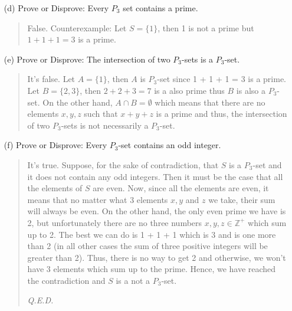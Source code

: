 \documentclass[12pt, a4paper]{article}                      %
\begin{document}
\begin{itemize}
\begin{itemize}
\item[]

\item[(d)]
Prove or Disprove: Every $P_3$ set contains a prime.
\begin{quote}
False. Counterexample: Let $S = \{1\}$, then 1 is not a prime but $1 + 1 + 1 = 3$ is a prime.
\end{quote}

\item[]
\item[]
\item[]

\item[(e)]
Prove or Disprove: The intersection of two $P_3$-sets is a $P_3$-set.
\begin{quote}
It's false. Let $A = \{1\}$, then $A$ is $P_3$-set since 1 + 1 + 1 = 3 is a prime.
Let $B = \{2, 3\}$, then $2 + 2 + 3 = 7$ is a also prime thus $B$ is also a $P_3$-set. On the other hand,
$A \cap B = \emptyset$ which means that there are no elements $x,y,z$ such that $x + y + z$ is a prime and thus,
the intersection of two $P_3$-sets is not necessarily a $P_3$-set.
\end{quote} 

\item[]

\item[(f)]
Prove or Disprove: Every $P_3$-set contains an odd integer.
\begin{quote}
It's true. Suppose, for the sake of contradiction, that $S$ is a $P_3$-set and it does not contain any odd integers. Then it must be the case that
all the elements of $S$ are even. Now, since all the elements are even, it means that no matter
what 3 elements $x, y$ and $z$ we take, their sum will always be even. On the other hand, the only even
prime we have is 2, but unfortunately there are no three numbers $x, y, z \in \mathbb{Z}^+$ which sum up to 2. The best we can do is 1 + 1 + 1
which is 3 and is one more than 2 (in all other cases the sum of three positive integers will be greater than 2).
Thus, there is no way to get 2 and otherwise, we won't have 3 elements which sum up to the prime. Hence,
we have reached the contradiction and $S$ is a not a $P_3$-set.
\begin{flushright}
\textit{Q.E.D.}
\end{flushright}
\end{quote}

\item[]


\end{itemize}
\end{itemize}
\end{document}
